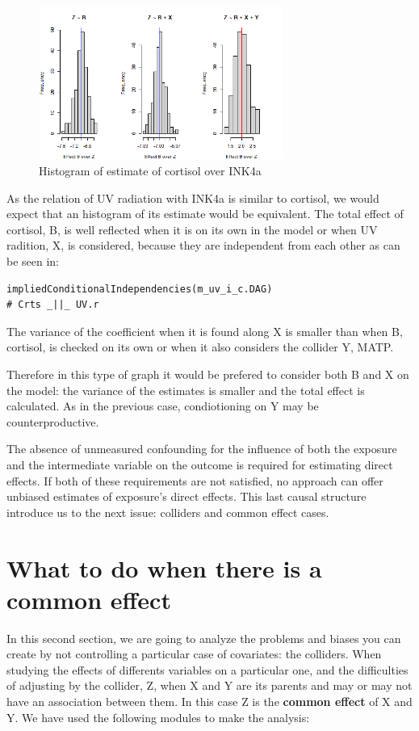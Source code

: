 \documentclass{article}
\begin{document}
\begin{figure}[h]
\caption{Histogram of estimate of cortisol over INK4a}
\includegraphics[width=8cm]{histextraoverY.png}
\centering
\end{figure}
As the relation of UV radiation with INK4a is similar to cortisol, we would expect that an histogram of its estimate would be equivalent. The total effect of cortisol, B, is well reflected when it is on its own in the model or when UV radition, X, is considered, because they are independent from each other as can be seen in:\par
\begin{lstlisting}
impliedConditionalIndependencies(m_uv_i_c.DAG)
# Crts _||_ UV.r
\end{lstlisting}

The variance of the coefficient when it is found along X is smaller than when B, cortisol, is checked on its own or when it also considers the collider Y, MATP.\par
Therefore in this type of graph it would be prefered to consider both B and X on the model: the variance of the estimates is smaller and the total effect is calculated. As in the previous case, condiotioning on Y may be counterproductive. \par
The absence of unmeasured confounding for the influence of both the exposure and the intermediate variable on the outcome is required for estimating direct effects. If both of these requirements are not satisfied, no approach can offer unbiased estimates of exposure's direct effects.
This last causal structure introduce us to the next issue: colliders and common effect cases.\par
\newpage

\section{What to do when there is a common effect}

In this second section, we are going to analyze the problems and biases you can create by not controlling a particular case of covariates: the colliders. When studying the effects of differents variables on a particular one, and the  difficulties of adjusting by the collider, Z, when X and Y are its parents and may or may not have an association between them. In this case Z is the \textbf{common effect} of X and Y. We have used the following modules to make the analysis:\par
\end{document}
